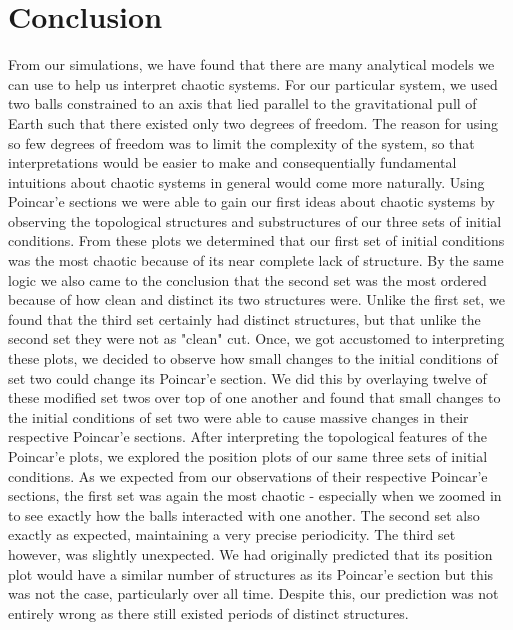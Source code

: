 \documentclass[twocolumn]{article}
\begin{document}
\section{Conclusion}
\hspace{\parindent}From our simulations, we have found that there are many analytical models we can use to help us interpret chaotic systems. For our particular system, we used two balls constrained to an axis that lied parallel to the gravitational pull of Earth such that there existed only two degrees of freedom. The reason for using so few degrees of freedom was to limit the complexity of the system, so that interpretations would be easier to make and consequentially fundamental intuitions about chaotic systems in general would come more naturally. Using Poincar'e sections we were able to gain our first ideas about chaotic systems by observing the topological structures and substructures of our three sets of initial conditions. From these plots we determined that our first set of initial conditions was the most chaotic because of its near complete lack of structure. By the same logic we also came to the conclusion that the second set was the most ordered because of how clean and distinct its two structures were. Unlike the first set, we found that the third set certainly had distinct structures, but that unlike the second set they were not as "clean" cut. Once, we got accustomed to interpreting these plots, we decided to observe how small changes to the initial conditions of set two could change its Poincar'e section. We did this by overlaying twelve of these modified set twos over top of one another and found that small changes to the initial conditions of set two were able to cause massive changes in their respective Poincar'e sections. After interpreting the topological features of the Poincar'e plots, we explored the position plots of our same three sets of initial conditions. As we expected from our observations of their respective Poincar'e sections, the first set was again the most chaotic - especially when we zoomed in to see exactly how the balls interacted with one another. The second set also exactly as expected, maintaining a very precise periodicity. The third set however, was slightly unexpected. We had originally predicted that its position plot would have a similar number of structures as its Poincar'e section but this was not the case, particularly over all time. Despite this, our prediction was not entirely wrong as there still existed periods of distinct structures.
\end{document}
